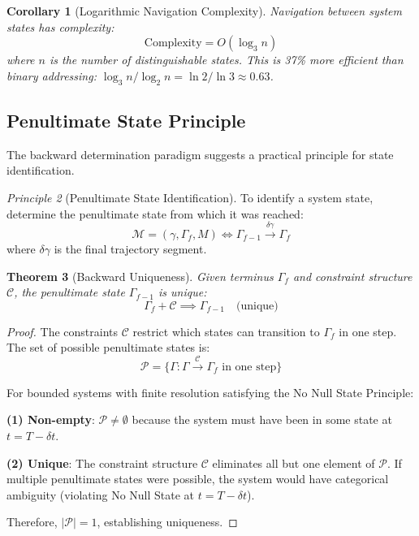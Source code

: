 \documentclass[aps,prd,twocolumn,superscriptaddress,floatfix,nofootinbib]{revtex4-2}
\newtheorem{theorem}{Theorem}[section]
\newtheorem{corollary}[theorem]{Corollary}
\theoremstyle{remark}
\newtheorem{principle}[theorem]{Principle}
\begin{document}
\begin{corollary}[Logarithmic Navigation Complexity]
\label{cor:log_navigation}
Navigation between system states has complexity:
\begin{equation}
\text{Complexity} = O(\log_3 n)
\end{equation}
where $n$ is the number of distinguishable states. This is 37\% more efficient than binary addressing: $\log_3 n / \log_2 n = \ln 2 / \ln 3 \approx 0.63$.
\end{corollary}

\subsection{Penultimate State Principle}

The backward determination paradigm suggests a practical principle for state identification.

\begin{principle}[Penultimate State Identification]
\label{princ:penultimate}
To identify a system state, determine the penultimate state from which it was reached:
\begin{equation}
\mathcal{M} = (\gamma, \Gamma_f, M) \iff \Gamma_{f-1} \xrightarrow{\delta\gamma} \Gamma_f
\end{equation}
where $\delta\gamma$ is the final trajectory segment.
\end{principle}

\begin{theorem}[Backward Uniqueness]
\label{thm:backward_uniqueness}
Given terminus $\Gamma_f$ and constraint structure $\mathcal{C}$, the penultimate state $\Gamma_{f-1}$ is unique:
\begin{equation}
\Gamma_f + \mathcal{C} \implies \Gamma_{f-1} \quad \text{(unique)}
\end{equation}
\end{theorem}

\begin{proof}
The constraints $\mathcal{C}$ restrict which states can transition to $\Gamma_f$ in one step. The set of possible penultimate states is:
$$
\mathcal{P} = \{\Gamma : \Gamma \xrightarrow{\mathcal{C}} \Gamma_f \text{ in one step}\}
$$

For bounded systems with finite resolution satisfying the No Null State Principle:

\textbf{(1) Non-empty}: $\mathcal{P} \neq \emptyset$ because the system must have been in some state at $t = T - \delta t$.

\textbf{(2) Unique}: The constraint structure $\mathcal{C}$ eliminates all but one element of $\mathcal{P}$. If multiple penultimate states were possible, the system would have categorical ambiguity (violating No Null State at $t = T - \delta t$).

Therefore, $|\mathcal{P}| = 1$, establishing uniqueness.
\end{proof}
\end{document}

